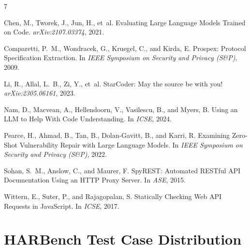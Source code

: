 \documentclass[10pt,twocolumn]{article}
\begin{document}


\begin{thebibliography}{7}

Chen, M., Tworek, J., Jun, H., et~al.
\newblock Evaluating Large Language Models Trained on Code.
\newblock \emph{arXiv:2107.03374}, 2021.

Comparetti, P.~M., Wondracek, G., Kruegel, C., and Kirda, E.
\newblock Prospex: Protocol Specification Extraction.
\newblock In \emph{IEEE Symposium on Security and Privacy (S\&P)}, 2009.

Li, R., Allal, L.~B., Zi, Y., et~al.
\newblock StarCoder: May the source be with you!
\newblock \emph{arXiv:2305.06161}, 2023.

Nam, D., Macvean, A., Hellendoorn, V., Vasilescu, B., and Myers, B.
\newblock Using an LLM to Help With Code Understanding.
\newblock In \emph{ICSE}, 2024.

Pearce, H., Ahmad, B., Tan, B., Dolan-Gavitt, B., and Karri, R.
\newblock Examining Zero-Shot Vulnerability Repair with Large Language Models.
\newblock In \emph{IEEE Symposium on Security and Privacy (S\&P)}, 2022.

Sohan, S.~M., Anslow, C., and Maurer, F.
\newblock SpyREST: Automated RESTful API Documentation Using an HTTP Proxy Server.
\newblock In \emph{ASE}, 2015.

Wittern, E., Suter, P., and Rajagopalan, S.
\newblock Statically Checking Web API Requests in JavaScript.
\newblock In \emph{ICSE}, 2017.

\end{thebibliography}

\appendix
\section{HARBench Test Case Distribution}
\end{document}
